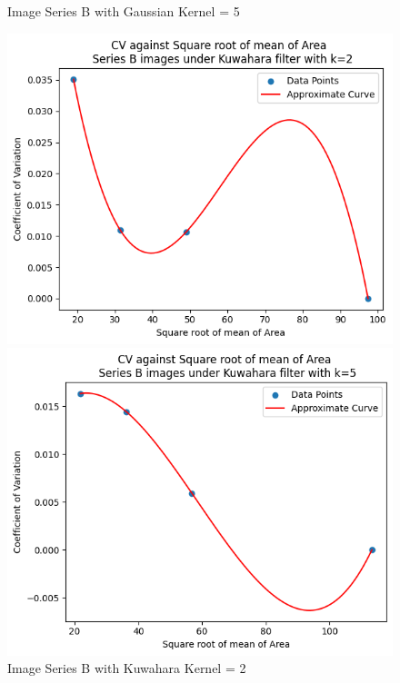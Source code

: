 \documentclass[runningheads]{llncs}
\begin{document}
\begin{figure}[h!]
\begin{minipage}[h]{0.47\linewidth}
\begin{center}
\caption{Image Series B with Gaussian Kernel = 5}
\label{SeriesB-Gaussian-Kernel5-AreaGraph}
\end{center}
\end{minipage}
\vfill
\vspace{0.2 cm}
\begin{minipage}[h]{0.47\linewidth}
\begin{center}
\includegraphics[width=1\linewidth]{Report/Result_Images/series_B_Kuwahara_kernel_2_area.png} 
\caption{Image Series B with Kuwahara Kernel = 2}
\label{SeriesB-Kuwahara-Kernel2-AreaGraph}
\end{center}
\end{minipage}
\hfill
\begin{minipage}[h]{0.47\linewidth}
\begin{center}
\includegraphics[width=1\linewidth]{Report/Result_Images/series_B_Kuwahara_kernel_5_area.png} 

\end{center}
\end{minipage}
\end{figure}
\end{document}
